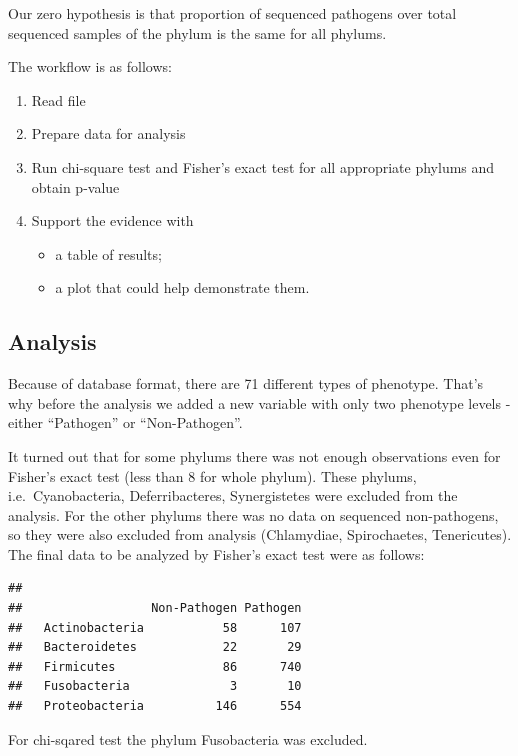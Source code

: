 \documentclass[]{article}
\providecommand{\tightlist}{%
  \setlength{\itemsep}{0pt}\setlength{\parskip}{0pt}}
\begin{document}
Our zero hypothesis is that proportion of sequenced pathogens over total
sequenced samples of the phylum is the same for all phylums.

The workflow is as follows:

\begin{enumerate}
\def\labelenumi{\arabic{enumi}.}
\tightlist
\item
  Read file
\item
  Prepare data for analysis
\item
  Run chi-square test and Fisher's exact test for all appropriate
  phylums and obtain p-value
\item
  Support the evidence with

  \begin{itemize}
  \tightlist
  \item
    a table of results;
  \item
    a plot that could help demonstrate them.
  \end{itemize}
\end{enumerate}

\subsection{Analysis}\label{analysis}

Because of database format, there are 71 different types of phenotype.
That's why before the analysis we added a new variable with only two
phenotype levels - either ``Pathogen'' or ``Non-Pathogen''.

It turned out that for some phylums there was not enough observations
even for Fisher's exact test (less than 8 for whole phylum). These
phylums, i.e.~Cyanobacteria, Deferribacteres, Synergistetes were
excluded from the analysis. For the other phylums there was no data on
sequenced non-pathogens, so they were also excluded from analysis
(Chlamydiae, Spirochaetes, Tenericutes). The final data to be analyzed
by Fisher's exact test were as follows:

\begin{verbatim}
##                 
##                  Non-Pathogen Pathogen
##   Actinobacteria           58      107
##   Bacteroidetes            22       29
##   Firmicutes               86      740
##   Fusobacteria              3       10
##   Proteobacteria          146      554
\end{verbatim}

For chi-sqared test the phylum Fusobacteria was excluded.
\end{document}

